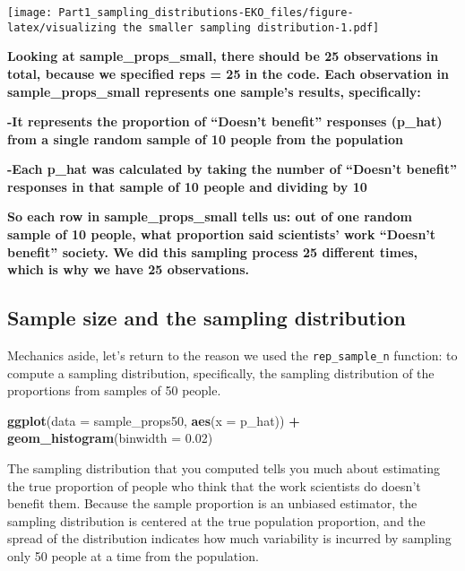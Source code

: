 \documentclass[
]{article}
\newenvironment{Shaded}{\begin{snugshade}}{\end{snugshade}}
\newcommand{\AttributeTok}[1]{\textcolor[rgb]{0.13,0.29,0.53}{#1}}
\newcommand{\FloatTok}[1]{\textcolor[rgb]{0.00,0.00,0.81}{#1}}
\newcommand{\FunctionTok}[1]{\textcolor[rgb]{0.13,0.29,0.53}{\textbf{#1}}}
\newcommand{\NormalTok}[1]{#1}
\newcommand{\SpecialCharTok}[1]{\textcolor[rgb]{0.81,0.36,0.00}{\textbf{#1}}}
\begin{document}
\texttt{[image: Part1\_sampling\_distributions-EKO\_files/figure-latex/visualizing the smaller sampling distribution-1.pdf]}

\textbf{Looking at sample\_props\_small, there should be 25 observations
in total, because we specified reps = 25 in the code. Each observation
in sample\_props\_small represents one sample's results, specifically:}

\textbf{-It represents the proportion of ``Doesn't benefit'' responses
(p\_hat) from a single random sample of 10 people from the population}

\textbf{-Each p\_hat was calculated by taking the number of ``Doesn't
benefit'' responses in that sample of 10 people and dividing by 10}

\textbf{So each row in sample\_props\_small tells us: out of one random
sample of 10 people, what proportion said scientists' work ``Doesn't
benefit'' society. We did this sampling process 25 different times,
which is why we have 25 observations.}

\subsection{Sample size and the sampling
distribution}\label{sample-size-and-the-sampling-distribution}

Mechanics aside, let's return to the reason we used the
\texttt{rep\_sample\_n} function: to compute a sampling distribution,
specifically, the sampling distribution of the proportions from samples
of 50 people.

\begin{Shaded}
\begin{Highlighting}[]
\FunctionTok{ggplot}\NormalTok{(}\AttributeTok{data =}\NormalTok{ sample\_props50, }\FunctionTok{aes}\NormalTok{(}\AttributeTok{x =}\NormalTok{ p\_hat)) }\SpecialCharTok{+}
  \FunctionTok{geom\_histogram}\NormalTok{(}\AttributeTok{binwidth =} \FloatTok{0.02}\NormalTok{)}
\end{Highlighting}
\end{Shaded}

The sampling distribution that you computed tells you much about
estimating the true proportion of people who think that the work
scientists do doesn't benefit them. Because the sample proportion is an
unbiased estimator, the sampling distribution is centered at the true
population proportion, and the spread of the distribution indicates how
much variability is incurred by sampling only 50 people at a time from
the population.
\end{document}
